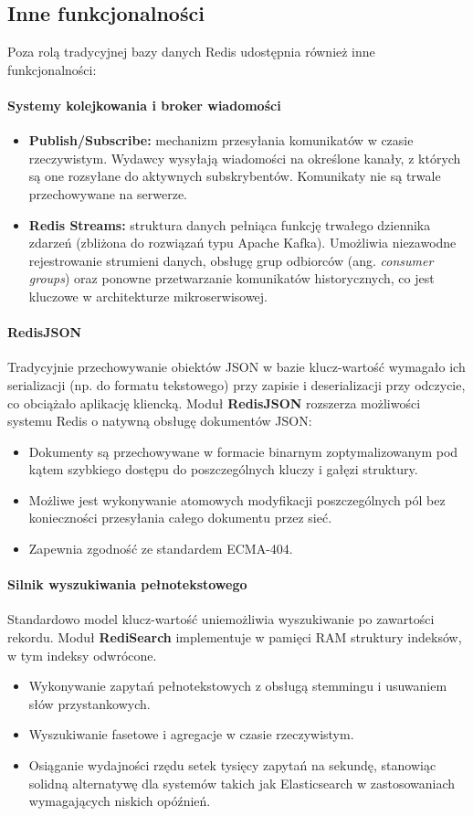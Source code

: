 \subsection{Inne funkcjonalności}
Poza rolą tradycyjnej bazy danych Redis udostępnia również inne funkcjonalności:
\paragraph{Systemy kolejkowania i broker wiadomości}
\begin{itemize}
    \item \textbf{Publish/Subscribe:} mechanizm przesyłania komunikatów w czasie rzeczywistym. Wydawcy wysyłają wiadomości na określone kanały, z których są one rozsyłane do aktywnych subskrybentów. Komunikaty nie są trwale przechowywane na serwerze.
    \item \textbf{Redis Streams:} struktura danych pełniąca funkcję trwałego dziennika zdarzeń (zbliżona do rozwiązań typu Apache Kafka). Umożliwia niezawodne rejestrowanie strumieni danych, obsługę grup odbiorców (ang. \emph{consumer groups}) oraz ponowne przetwarzanie komunikatów historycznych, co jest kluczowe w architekturze mikroserwisowej.
\end{itemize}
\paragraph{RedisJSON}
Tradycyjnie przechowywanie obiektów JSON w bazie klucz-wartość wymagało ich serializacji (np. do formatu tekstowego) przy zapisie i deserializacji przy odczycie, co obciążało aplikację kliencką. Moduł \textbf{RedisJSON} rozszerza możliwości systemu Redis o natywną obsługę dokumentów JSON:
\begin{itemize}
    \item Dokumenty są przechowywane w formacie binarnym zoptymalizowanym pod kątem szybkiego dostępu do poszczególnych kluczy i gałęzi struktury.
    \item Możliwe jest wykonywanie atomowych modyfikacji poszczególnych pól bez konieczności przesyłania całego dokumentu przez sieć.
    \item Zapewnia zgodność ze standardem ECMA-404.
\end{itemize}
\paragraph{Silnik wyszukiwania pełnotekstowego}
Standardowo model klucz-wartość uniemożliwia wyszukiwanie po zawartości rekordu. Moduł \textbf{RediSearch} implementuje w pamięci RAM struktury indeksów, w tym indeksy odwrócone.
\begin{itemize}
    \item Wykonywanie zapytań pełnotekstowych z obsługą stemmingu i usuwaniem słów przystankowych.
    \item Wyszukiwanie fasetowe i agregacje w czasie rzeczywistym.
    \item Osiąganie wydajności rzędu setek tysięcy zapytań na sekundę, stanowiąc solidną alternatywę dla systemów takich jak Elasticsearch w zastosowaniach wymagających niskich opóźnień.
\end{itemize}
